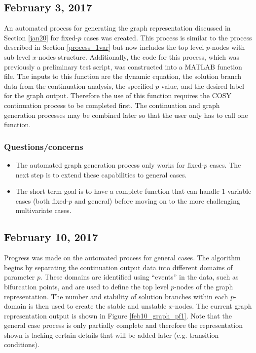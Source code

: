 \documentclass[12pt]{article}
\begin{document}
\subsection{February 3, 2017}
An automated process for generating the graph representation discussed in Section \ref{jan20} for fixed-$p$ cases was created. This process is similar to the process described in Section \ref{process_1var} but now includes the top level $p$-nodes with sub level $x$-nodes structure. Additionally, the code for this process, which was previously a preliminary test script, was constructed into a MATLAB function file. The inputs to this function are the dynamic equation, the solution branch data from the continuation analysis, the specified $p$ value, and the desired label for the graph output. Therefore the use of this function requires the COSY continuation process to be completed first. The continuation and graph generation processes may be combined later so that the user only has to call one function. 

\subsubsection{Questions/concerns}
\begin{itemize}
\item The automated graph generation process only works for fixed-$p$ cases. The next step is to extend these capabilities to general cases. 
\item The short term goal is to have a complete function that can handle 1-variable cases (both fixed-$p$ and general) before moving on to the more challenging multivariate cases.
\end{itemize}


\subsection{February 10, 2017}
Progress was made on the automated process for general cases. The algorithm begins by separating the continuation output data into different domains of parameter $p$. These domains are identified using ``events'' in the data, such as bifurcation points, and are used to define the top level $p$-nodes of the graph representation. The number and stability of solution branches within each $p$-domain is then used to create the stable and unstable $x$-nodes. The current graph representation output is shown in Figure \ref{feb10_graph_pf1}. Note that the general case process is only partially complete and therefore the representation shown is lacking certain details that will be added later (e.g. transition conditions).
\end{document}
